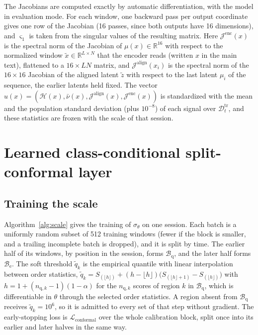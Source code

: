 \documentclass{article}
\begin{document}
The Jacobians are computed exactly by automatic differentiation, with the model in evaluation mode. For each window, one backward pass per output coordinate gives one row of the Jacobian (16 passes, since both outputs have 16 dimensions), and $\varsigma_1$ is taken from the singular values of the resulting matrix. Here $\mathcal{J}^{\mathrm{enc}}(x)$ is the spectral norm of the Jacobian of $\mu(x)\in\mathbb{R}^{16}$ with respect to the normalized window $\tilde x\in\mathbb{R}^{L\times N}$ that the encoder reads (written $x$ in the main text), flattened to a $16\times LN$ matrix, and $\mathcal{J}^{\mathrm{align}}(x_i)$ is the spectral norm of the $16\times16$ Jacobian of the aligned latent $\tilde z$ with respect to the last latent $\mu_i$ of the sequence, the earlier latents held fixed. The vector $u(x)=(\mathcal{H}(x),\bar\nu(x),\mathcal{J}^{\mathrm{align}}(x),\mathcal{J}^{\mathrm{enc}}(x))$ is standardized with the mean and the population standard deviation (plus $10^{-8}$) of each signal over $\mathcal{D}^{\mathrm{tr}}_t$, and these statistics are frozen with the scale of that session.

\section{Learned class-conditional split-conformal layer}
\label{app:conformal}

\subsection{Training the scale}
Algorithm~\ref{alg:scale} gives the training of $\sigma_\theta$ on one session. Each batch is a uniformly random subset of 512 training windows (fewer if the block is smaller, and a trailing incomplete batch is dropped), and it is split by time. The earlier half of its windows, by position in the session, forms $\mathcal{B}_{\mathrm{q}}$, and the later half forms $\mathcal{B}_{\mathrm{e}}$. The soft threshold $\tilde q_k$ is the empirical quantile with linear interpolation between order statistics, $\tilde q_k=S_{(\lfloor h\rfloor)}+(h-\lfloor h\rfloor)\big(S_{(\lfloor h\rfloor+1)}-S_{(\lfloor h\rfloor)}\big)$ with $h=1+(n_{\mathrm{q},k}-1)(1-\alpha)$ for the $n_{\mathrm{q},k}$ scores of region $k$ in $\mathcal{B}_{\mathrm{q}}$, which is differentiable in $\theta$ through the selected order statistics. A region absent from $\mathcal{B}_{\mathrm{q}}$ receives $\tilde q_k=10^6$, so it is admitted to every set of that step without gradient. The early-stopping loss is $\mathcal{L}_{\mathrm{conformal}}$ over the whole calibration block, split once into its earlier and later halves in the same way.
\end{document}
